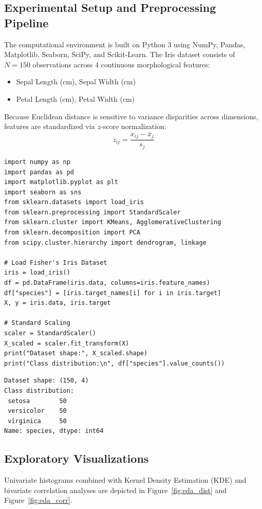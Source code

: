 \documentclass[12pt]{article}
\begin{document}
\subsection{Experimental Setup and Preprocessing Pipeline}
The computational environment is built on Python 3 using NumPy, Pandas, Matplotlib, Seaborn, SciPy, and Scikit-Learn. The Iris dataset consists of $N = 150$ observations across 4 continuous morphological features:
\begin{itemize}
    \item Sepal Length (cm), Sepal Width (cm)
    \item Petal Length (cm), Petal Width (cm)
\end{itemize}
Because Euclidean distance is sensitive to variance disparities across dimensions, features are standardized via $z$-score normalization:
\begin{equation}
z_{ij} = \frac{x_{ij} - \bar{x}_j}{s_j}
\end{equation}

\begin{lstlisting}[style=code, caption={Dataset Loading, Standardization, and Environment Initialization}]
import numpy as np
import pandas as pd
import matplotlib.pyplot as plt
import seaborn as sns
from sklearn.datasets import load_iris
from sklearn.preprocessing import StandardScaler
from sklearn.cluster import KMeans, AgglomerativeClustering
from sklearn.decomposition import PCA
from scipy.cluster.hierarchy import dendrogram, linkage

# Load Fisher's Iris Dataset
iris = load_iris()
df = pd.DataFrame(iris.data, columns=iris.feature_names)
df["species"] = [iris.target_names[i] for i in iris.target]
X, y = iris.data, iris.target

# Standard Scaling
scaler = StandardScaler()
X_scaled = scaler.fit_transform(X)
print("Dataset shape:", X_scaled.shape)
print("Class distribution:\n", df["species"].value_counts())
\end{lstlisting}

\begin{lstlisting}[style=output, caption={Dataset Summary Output}]
Dataset shape: (150, 4)
Class distribution:
 setosa        50
 versicolor    50
 virginica     50
Name: species, dtype: int64
\end{lstlisting}

\subsection{Exploratory Visualizations}
Univariate histograms combined with Kernel Density Estimation (KDE) and bivariate correlation analyses are depicted in Figure~\ref{fig:eda_dist} and Figure~\ref{fig:eda_corr}.
\end{document}
